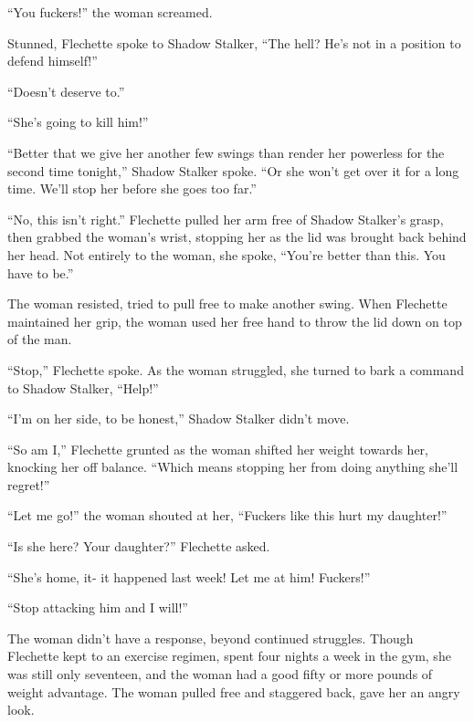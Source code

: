 ``You fuckers!'' the woman screamed.



Stunned, Flechette spoke to Shadow Stalker, ``The hell?  He's not in a position to defend himself!''



``Doesn't deserve to.''



``She's going to kill him!''



``Better that we give her another few swings than render her powerless for the second time tonight,'' Shadow Stalker spoke.  ``Or she won't get over it for a long time.  We'll stop her before she goes too far.''



``No, this isn't right.'' Flechette pulled her arm free of Shadow Stalker's grasp, then grabbed the woman's wrist, stopping her as the lid was brought back behind her head.  Not entirely to the woman, she spoke, ``You're better than this.  You have to be.''



The woman resisted, tried to pull free to make another swing.  When Flechette maintained her grip, the woman used her free hand to throw the lid down on top of the man.



``Stop,'' Flechette spoke.  As the woman struggled, she turned to bark a command to Shadow Stalker, ``Help!''



``I'm on her side, to be honest,'' Shadow Stalker didn't move.



``So am I,'' Flechette grunted as the woman shifted her weight towards her, knocking her off balance.  ``Which means stopping her from doing anything she'll regret!''



``Let me go!'' the woman shouted at her, ``Fuckers like this hurt my daughter!''



``Is she here?  Your daughter?''  Flechette asked.



``She's home, it- it happened last week!  Let me at him!  Fuckers!''



``Stop attacking him and I will!''



The woman didn't have a response, beyond continued struggles.  Though Flechette kept to an exercise regimen, spent four nights a week in the gym, she was still only seventeen, and the woman had a good fifty or more pounds of weight advantage.  The woman pulled free and staggered back, gave her an angry look.



